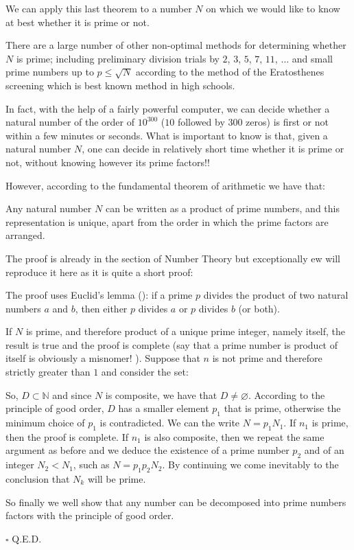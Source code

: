 	We can apply this last theorem to a number $N$ on which we would like to know at best whether it is prime or not.

	There are a large number of other non-optimal methods for determining whether $N$ is prime; including preliminary division trials by $2$, $3$, $5$, $7$, $11$, $\ldots$ and small prime numbers up to $p\leq\sqrt{N}$ according to the method of the Eratosthenes screening which is best known method in high schools.
	\begin{tcolorbox}[title=Remark,colframe=black,arc=10pt]
	In fact, with the help of a fairly powerful computer, we can decide whether a natural number of the order of $10^{300}$ ($10$ followed by $300$ zeros) is first or not within a few minutes or seconds. What is important to know is that, given a natural number $N$, one can decide in relatively short time whether it is prime or not, without knowing however its prime factors!!
	\end{tcolorbox}
	However, according to the fundamental theorem of arithmetic we have that:
	\begin{theorem}
	Any natural number $N$ can be written as a product of prime numbers, and this representation is unique, apart from the order in which the prime factors are arranged.
	\end{theorem}
	The proof is already in the section of Number Theory but exceptionally ew will reproduce it here as it is quite a short proof:
	\begin{dem}
	The proof uses Euclid's lemma (): if a prime $p$ divides the product of two natural numbers $a$ and $b$, then either $p$ divides $a$ or $p$ divides $b$ (or both).
	
	If $N$ is prime, and therefore product of a unique prime integer, namely itself, the result is true and the proof is complete (say that a prime number is product of itself is obviously a misnomer! ). Suppose that $n$ is not prime and therefore strictly greater than $1$ and consider the set:
	
	So, $D\subset \mathbb{N}$ and since $N$ is composite, we have that $D\neq \varnothing$. According to the principle of good order, $D$ has a smaller element $p_1$ that is prime, otherwise the minimum choice of $p_1$ is contradicted. We can the write $N=p_1N_1$. If $n_1$ is prime, then the proof is complete. If $n_1$ is also composite, then we repeat the same argument as before and we deduce the existence of a prime number $p_2$ and of an integer $N_2<N_1$, such as $N=p_1p_2N_2$. By continuing we come inevitably to the conclusion that $N_k$ will be prime.
	
	So finally we well show that any number can be decomposed into prime numbers factors with the principle of good order.
	\begin{flushright}
		$\square$  Q.E.D.
	\end{flushright}
	\end{dem}
